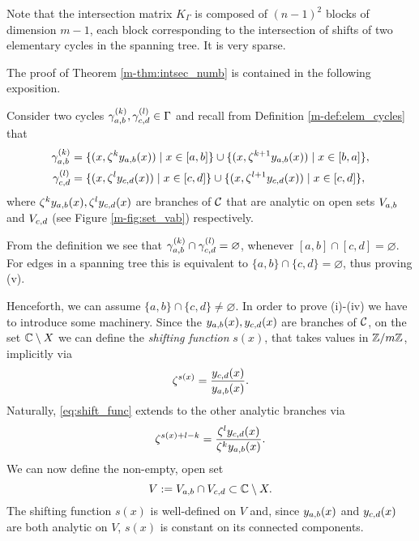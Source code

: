 \documentclass[main.tex]{subfiles}
\begin{document}
 \begin{rmk}
     Note that the intersection matrix $K_{\Gamma}$ is composed of
  $(n-1)^2$ blocks of dimension $m-1$, each block corresponding to the intersection
  of shifts of two elementary cycles in the spanning tree. It is very sparse.
 \end{rmk}


 \bigskip
 The proof of Theorem \ref{m-thm:intsec_numb} is contained in the following exposition.
 \bigskip

  Consider
  two cycles $\gamma_{a,b}^{(k)},\gamma_{c,d}^{(l)} \in \Gamma$ and
  recall from Definition \ref{m-def:elem_cycles} that
   \begin{align*}
      \gamma_{a,b}^{(k)} & = \{  (x,\zeta^k y_{a,b}(x))  \mid  x \in [a,b]  \} \cup \{  (x,\zeta^{k+1} y_{a,b}(x))  \mid  x \in [b,a]  \}, \\
      \gamma_{c,d}^{(l)} & = \{  (x,\zeta^l y_{c,d}(x))  \mid  x \in [c,d]  \} \cup \{  (x,\zeta^{l+1} y_{c,d}(x))  \mid  x \in [c,d]  \},
   \end{align*}
  where $\zeta^ky_{a,b}(x),\zeta^ly_{c,d}(x)$ are branches of $\mathcal{C}$ that are analytic on open sets $V_{a,b}$ and $V_{c,d}$
  (see Figure \ref{m-fig:set_vab}) respectively.

  From the definition we see that $\gamma_{a,b}^{(k)} \cap \gamma_{c,d}^{(l)} = \varnothing$, whenever $[a,b] \cap [c,d] = \varnothing$. For edges in a spanning tree
  this is equivalent to $\{a,b\} \cap \{c,d\} = \varnothing$, thus
  proving (v).

   Henceforth, we can assume $\{a,b\} \cap \{c,d\} \ne \varnothing$. In order to prove (i)-(iv) we have to introduce some machinery. Since the $y_{a,b}(x),y_{c,d}(x)$ are branches of $\mathcal{C}$,
   on the set $\mathbb{C} \setminus X$
   we can define the \emph{shifting function}
   $s(x)$, that takes values in $\mathbb{Z}/m\mathbb{Z}$, implicitly via
  \begin{equation}\label{eq:shift_func}
   \zeta^{s(x)} = \frac{y_{c,d}(x)}{y_{a,b}(x)}.
   \end{equation}
  Naturally, \eqref{eq:shift_func} extends to the other analytic branches via
  \begin{equation*}
   \zeta^{s(x)+l-k} = \frac{\zeta^ly_{c,d}(x)}{\zeta^ky_{a,b}(x)}.
   \end{equation*}
   We can now define the non-empty, open set
   \begin{equation*}
    V := V_{a,b} \cap V_{c,d} \subset \mathbb{C} \setminus X.
   \end{equation*}
 The shifting function $s(x)$ is well-defined on $V$ and, since $y_{a,b}(x)$ and $y_{c,d}(x)$ are
  both analytic on $V$, $s(x)$ is constant on its
  connected components.
\end{document}
